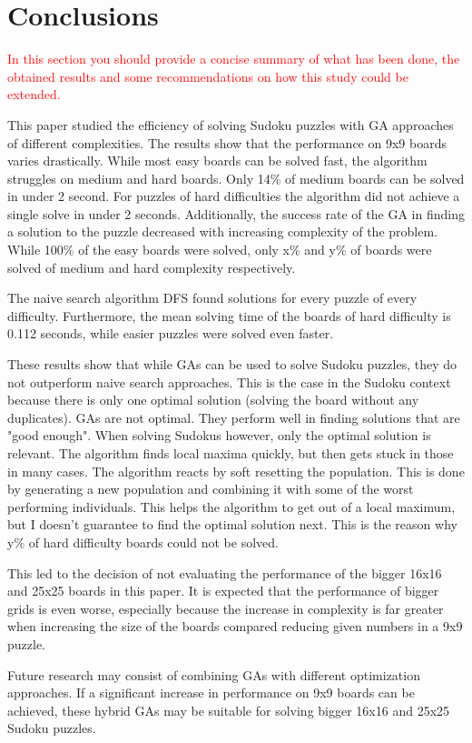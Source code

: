 \section{Conclusions}
\label{sec:conclusions}

\textcolor{red}{In this section you should provide a concise summary of what has been done, the obtained results and some recommendations on how this study could be extended.}

This paper studied the efficiency of solving Sudoku puzzles with GA approaches of different complexities. The results show that the performance on 9x9 boards varies drastically. While most easy boards can be solved fast, the algorithm struggles on medium and hard boards. Only 14\% of medium boards can be solved in under 2 second. For puzzles of hard difficulties the algorithm did not achieve a single solve in under 2 seconds. Additionally, the success rate of the GA in finding a solution to the puzzle decreased with increasing complexity of the problem. While 100\% of the easy boards were solved, only x\% and y\% of boards were solved of medium and hard complexity respectively. 

The naive search algorithm DFS found solutions for every puzzle of every difficulty. Furthermore, the mean solving time of the boards of hard difficulty is 0.112 seconds, while easier puzzles were solved even faster. 

These results show that while GAs can be used to solve Sudoku puzzles, they do not outperform naive search approaches. This is the case in the Sudoku context because there is only one optimal solution (solving the board without any duplicates). GAs are not optimal. They perform well in finding solutions that are "good enough". When solving Sudokus however, only the optimal solution is relevant. The algorithm finds local maxima quickly, but then gets stuck in those in many cases. The algorithm reacts by soft resetting the population. This is done by generating a new population and combining it with some of the worst performing individuals. This helps the algorithm to get out of a local maximum, but I doesn't guarantee to find the optimal solution next. This is the reason why y\% of hard difficulty boards could not be solved.

This led to the decision of not evaluating the performance of the bigger 16x16 and 25x25 boards in this paper. It is expected that the performance of bigger grids is even worse, especially because the increase in complexity is far greater when increasing the size of the boards compared reducing given numbers in a 9x9 puzzle.

Future research may consist of combining GAs with different optimization approaches. If a significant increase in performance on 9x9 boards can be achieved, these hybrid GAs may be suitable for solving bigger 16x16 and 25x25 Sudoku puzzles.